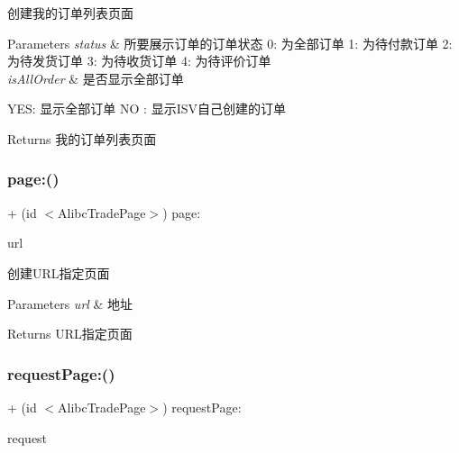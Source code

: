 创建我的订单列表页面


\begin{DoxyParams}{Parameters}
{\em status} & 所要展示订单的订单状态 0\+: 为全部订单 1\+: 为待付款订单 2\+: 为待发货订单 3\+: 为待收货订单 4\+: 为待评价订单 \\
\hline
{\em is\+All\+Order} & 是否显示全部订单\\
\hline
\end{DoxyParams}
Y\+ES\+: 显示全部订单 NO \+: 显示\+I\+S\+V自己创建的订单

\begin{DoxyReturn}{Returns}
我的订单列表页面 
\end{DoxyReturn}
\mbox{\label{interface_alibc_trade_page_factory_a066f98de1eb14f7c767fd3a3d32ed8ac}} 
\subsubsection{\texorpdfstring{page\+:()}{page:()}}
{\footnotesize\ttfamily + (id $<$Alibc\+Trade\+Page$>$) page\+: \begin{DoxyParamCaption}\item[{(N\+S\+String $\ast$)}]{url }\end{DoxyParamCaption}}

创建\+U\+R\+L指定页面


\begin{DoxyParams}{Parameters}
{\em url} & 地址\\
\hline
\end{DoxyParams}
\begin{DoxyReturn}{Returns}
U\+R\+L指定页面 
\end{DoxyReturn}
\mbox{\label{interface_alibc_trade_page_factory_a75b1d5426dc6e4eb9a6d2560312fe773}} 
\subsubsection{\texorpdfstring{request\+Page\+:()}{requestPage:()}}
{\footnotesize\ttfamily + (id $<$Alibc\+Trade\+Page$>$) request\+Page\+: \begin{DoxyParamCaption}\item[{(N\+S\+Mutable\+U\+R\+L\+Request $\ast$)}]{request }\end{DoxyParamCaption}}

